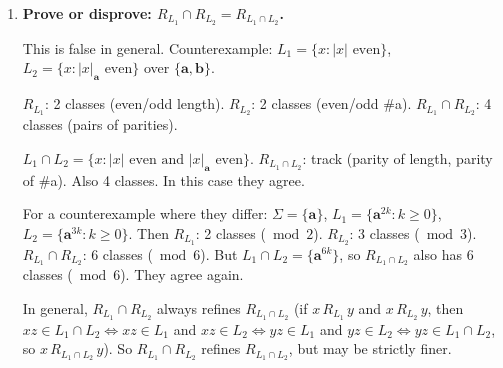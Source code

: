 \begin{enumerate}[{2.}1.]
$[\mathbf{110}]_{R_K}=\{y\mid y\,R_K\,\mathbf{110}\}=\{y\mid(\forall z)(yz\in K\Leftrightarrow\mathbf{110}z\in K)\}$. A string $\mathbf{110}z\in K$ iff $\mathbf{110}z$ is a palindrome, i.e., $\mathbf{110}z=(110z)^r=z^r011$. This requires $z^r=\mathbf{110}$ i.e., $z=\mathbf{011}$. So $\mathbf{110z}\in K\Leftrightarrow z=\mathbf{011}$. Similarly, $yz\in K\Leftrightarrow z=y^r$. So $y\,R_K\,\mathbf{110}\Leftrightarrow[y^r=\mathbf{011}\Leftrightarrow z=\mathbf{011}$ gives $yz\in K]$, which means $y^r=\mathbf{011}$... This shows $[\mathbf{110}]_{R_K}=\{\mathbf{110}\}$ (only the string itself, since reverses must match).

The $R_K$-class of $x$ for palindromes consists of all $y$ such that $yz\in K\Leftrightarrow xz\in K$ for all $z$. Since $xz\in K\Leftrightarrow xz=(xz)^r=z^rx^r\Leftrightarrow z=x^r$ (for strings where $xz$ is a palindrome only if $x$ is the first half reversed of $xz$). More precisely: $xz$ is a palindrome iff $xz=(xz)^r$. For distinct $x$, the future sets $\{z:xz\in K\}$ are distinct (since $x^r$ is in the future of $x$ but $y^r\neq x^r$ if $y\neq x$). So $R_K$ has infinitely many classes (one per string), confirming $K$ is not FAD.

\item \textbf{Prove or disprove: $R_{L_1}\cap R_{L_2}=R_{L_1\cap L_2}$.}

This is false in general. Counterexample: $L_1=\{x:|x|\text{ even}\}$, $L_2=\{x:|x|_\mathbf{a}\text{ even}\}$ over $\{\mathbf{a},\mathbf{b}\}$.

$R_{L_1}$: 2 classes (even/odd length). $R_{L_2}$: 2 classes (even/odd \#a). $R_{L_1}\cap R_{L_2}$: 4 classes (pairs of parities).

$L_1\cap L_2=\{x:|x|\text{ even and }|x|_\mathbf{a}\text{ even}\}$. $R_{L_1\cap L_2}$: track (parity of length, parity of \#a). Also 4 classes. In this case they agree.

For a counterexample where they differ: $\Sigma=\{\mathbf{a}\}$, $L_1=\{\mathbf{a}^{2k}:k\geq 0\}$, $L_2=\{\mathbf{a}^{3k}:k\geq 0\}$. Then $R_{L_1}$: 2 classes ($\bmod 2$). $R_{L_2}$: 3 classes ($\bmod 3$). $R_{L_1}\cap R_{L_2}$: 6 classes ($\bmod 6$). But $L_1\cap L_2=\{\mathbf{a}^{6k}\}$, so $R_{L_1\cap L_2}$ also has 6 classes ($\bmod 6$). They agree again.

In general, $R_{L_1}\cap R_{L_2}$ always refines $R_{L_1\cap L_2}$ (if $x\,R_{L_1}\,y$ and $x\,R_{L_2}\,y$, then $xz\in L_1\cap L_2\Leftrightarrow xz\in L_1$ and $xz\in L_2\Leftrightarrow yz\in L_1$ and $yz\in L_2\Leftrightarrow yz\in L_1\cap L_2$, so $x\,R_{L_1\cap L_2}\,y$). So $R_{L_1}\cap R_{L_2}$ refines $R_{L_1\cap L_2}$, but may be strictly finer.


\end{enumerate}
